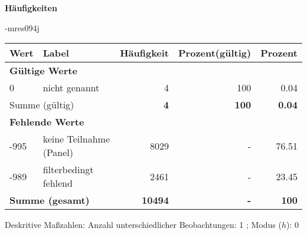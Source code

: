         		\vspace*{0.5cm}
                \noindent\textbf{Häufigkeiten}

                \vspace*{-\baselineskip}
					\begin{filecontents}{\jobname-mres094j}
					\begin{longtable}{lXrrr}
					\toprule
					\textbf{Wert} & \textbf{Label} & \textbf{Häufigkeit} & \textbf{Prozent(gültig)} & \textbf{Prozent} \\
					\endhead
					\midrule
					\multicolumn{5}{l}{\textbf{Gültige Werte}}\\

					0 &
					\multicolumn{1}{X}{ nicht genannt   } &


					  \num{4} &
					  \num[round-mode=places,round-precision=2]{100} &
					    \num[round-mode=places,round-precision=2]{0,04} \\
					\midrule
					\multicolumn{2}{l}{Summe (gültig)} &
					  \textbf{\num{4}} &
					\textbf{100} &
					  \textbf{\num[round-mode=places,round-precision=2]{0,04}} \\
					\multicolumn{5}{l}{\textbf{Fehlende Werte}}\\
							-995 &
							keine Teilnahme (Panel) &
							  \num{8029} &
							 - &
							  \num[round-mode=places,round-precision=2]{76,51} \\
							-989 &
							filterbedingt fehlend &
							  \num{2461} &
							 - &
							  \num[round-mode=places,round-precision=2]{23,45} \\
					\midrule
					\multicolumn{2}{l}{\textbf{Summe (gesamt)}} &
				      \textbf{\num{10494}} &
				    \textbf{-} &
				    \textbf{100} \\
					\bottomrule
					\end{longtable}
					\end{filecontents}
				\label{tableValues:mres094j}
				\vspace*{-\baselineskip}
                    \begin{noten}
                	    \note{} Deskritive Maßzahlen:
                	    Anzahl unterschiedlicher Beobachtungen: 1%
                	    ; 
                	      Modus ($h$): 0
                     \end{noten}


